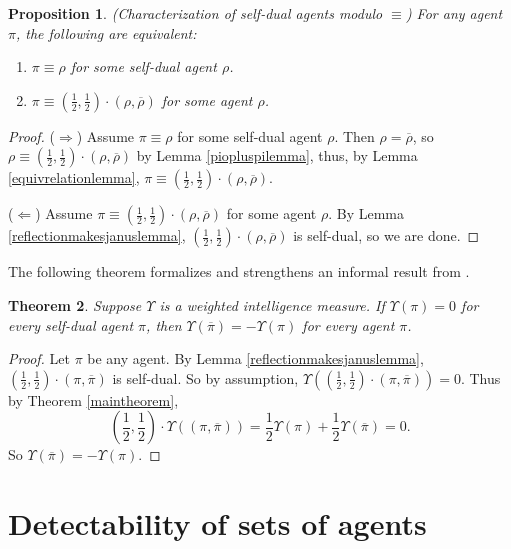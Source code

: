 \documentclass[twoside]{article}
\newtheorem{theorem}{Theorem}
\newtheorem{proposition}[theorem]{Proposition}
\begin{document}
\begin{proposition}
    (Characterization of self-dual agents modulo $\equiv$)
    For any agent $\pi$, the following are equivalent:
    \begin{enumerate}
        \item $\pi\equiv\rho$ for some self-dual agent $\rho$.
        \item $\pi\equiv(\frac12,\frac12)\cdot(\rho,\overline{\rho})$
            for some agent $\rho$.
    \end{enumerate}
\end{proposition}

\begin{proof}
    ($\Rightarrow$)
    Assume $\pi\equiv\rho$ for some self-dual agent $\rho$.
    Then $\rho=\overline{\rho}$, so
    $\rho\equiv (\frac12,\frac12)\cdot(\rho,\overline{\rho})$ by
    Lemma \ref{piopluspilemma}, thus, by Lemma \ref{equivrelationlemma},
    $\pi\equiv(\frac12,\frac12)\cdot(\rho,\overline{\rho})$.

    ($\Leftarrow$)
    Assume $\pi\equiv(\frac12,\frac12)\cdot(\rho,\overline{\rho})$ for some agent $\rho$.
    By Lemma \ref{reflectionmakesjanuslemma},
    $(\frac12,\frac12)\cdot(\rho,\overline{\rho})$ is self-dual, so we are done.
\end{proof}

The following theorem formalizes and strengthens an informal result
from \cite{alexander2021reward}.

\begin{theorem}
    Suppose $\Upsilon$ is a weighted intelligence measure.
    If $\Upsilon(\pi)=0$ for every self-dual agent $\pi$,
    then $\Upsilon(\overline{\pi})=-\Upsilon(\pi)$
    for every agent $\pi$.
\end{theorem}

\begin{proof}
    Let $\pi$ be any agent.
    By Lemma \ref{reflectionmakesjanuslemma},
    $(\frac12,\frac12)\cdot(\pi,\overline\pi)$ is self-dual.
    So by assumption,
    $\Upsilon((\frac12,\frac12)\cdot(\pi,\overline\pi))=0$.
    Thus by Theorem \ref{maintheorem},
    \[
        (\mbox{$\frac12$},\mbox{$\frac12$})\cdot\Upsilon((\pi,\overline\pi))
        =\mbox{$\frac12$}\Upsilon(\pi)+\mbox{$\frac12$}\Upsilon(\overline\pi)=0.
    \]
    So $\Upsilon(\overline{\pi})=-\Upsilon(\pi)$.
\end{proof}


\section{Detectability of sets of agents}
\end{document}
